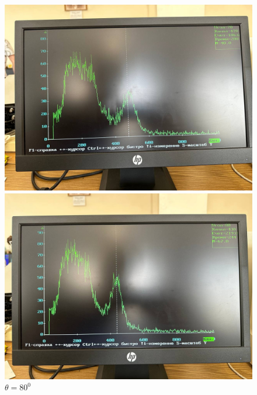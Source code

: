\documentclass[a4paper, 12pt]{article}
\begin{document}
    \begin{figure}[H]
    \begin{minipage}[h]{0.3\linewidth}
        \includegraphics[width = 1\linewidth]{res/08.jpg}
        \caption{$\theta = 70^0$}
    \end{minipage}
    \hfill
    \begin{minipage}[h]{0.3\linewidth}
        \includegraphics[width = 1\linewidth]{res/09.jpg}
        \caption{$\theta = 80^0$}
    \end{minipage}
    \hfill
    \begin{minipage}[h]{0.3\linewidth}

\end{minipage}
\end{figure}
\end{document}
